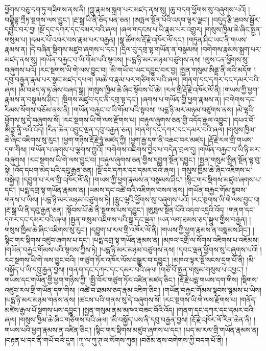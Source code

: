 ཕྱོགས་བཅུ་དག་ཏུ་གཟིགས་ནས་ནི། །ཀླུ་རྣམས་སྐྲག་པར་མཛད་ནས་སུ། །ཆུ་བདག་ཕྱོགས་སུ་བཞུགས་པའོ། །བགྷྣཱིནྟ་ཀྲྀཏ་སྔགས་ལས་བྱུང་། །རྔ་སྒྲ་ཡི་ནི་ཅོད་པན་ཅན། །ཨཏྤལ་སྔོན་པོའི་འདབ་ལྟར་ལྗང་། །བདུད་རྩི་ཐབས་སྦྱོར་དབྱུང་བར་བྱ། །སྔོ་དང་དཀར་དང་དམར་བའི་ཞལ། །ཞལ་གདངས་པ་ཡི་རྣམ་པར་འགྱུར། །གསུས་ཁྱིམ་ཆེ་ཞིང་སྤྱན་གསུམ་པ། །དམར་པོ་འབར་བས་རྣམ་པར་བརྒྱན། །སྣ་ཚོགས་རྡོ་རྗེ་འཁོར་ལོ་དང་། །གཏུན་ཤིང་ཡང་ནི་གཡས་རྣམས་ན། །དེ་བཞིན་སྡིགས་མཛུབ་ཞགས་པ་དང་། །དྲིལ་བུ་དགྲ་སྟ་གཡོན་ན་བསྣམས། །བགེགས་རྣམས་སྐྲག་པར་མཛད་ནས་སུ། །གཡོན་བརྐྱང་བ་ཡི་གོམ་པའི་སྟབས། །པདྨ་ཉི་མར་མཉམ་བཙུགས་ནས། །ལུས་ངན་ཕྱོགས་སུ་བཞུགས་པའོ། །རང་སྔགས་ཡི་གེ་ལས་བྱུང་བ། །མི་གཡོ་བ་ཡང་དབྱུང་བར་བྱ། །སྤྱན་གསུམ་ཨིནྡྲ་ནི་ལའི་མདོག །དབུ་བརྒྱན་རྣམ་པར་སྣང་མཛད་དཔལ། །མཆེ་བ་རྣམ་པར་གཙིགས་པའི་ཞལ། །གནག་དང་དཀར་དང་དམར་བའི་ཞལ། །མི་བཟད་ཧ་ཧ་ཞེས་བཞད་སྒྲ། །གསུས་ཁྱིམ་ཆེ་ཞིང་སྟོབས་པོ་ཆེ། །རལ་གྲི་རྡོ་རྗེ་འཁོར་ལོ་ནི། །གཡས་ཀྱི་ཕྱག་རྣམས་ན་བསྣམས་ཤིང་། །སྡིགས་མཛུབ་དང་ནི་དགྲ་སྟ་དང་། །ཞགས་པ་གཡོན་གྱི་ཕྱག་རྣམས་ན། །བགེགས་དང་རིམས་སོགས་བཅོམ་ནས་ནི། །གཡོན་བརྐྱང་བ་ཡི་གོམ་པའི་སྟབས། །པདྨ་ཉི་མར་མཉམ་བཙུགས་ནས། །མེ་ལྷའི་ཕྱོགས་སུ་དེ་བཞུགས་སོ། །རང་སྔགས་ཡི་གེ་ལས་རྫོགས་པ། །བརྟུལ་ཞུགས་ཅན་གྱི་འདོད་རྒྱལ་འབྱུང་། །དཔའ་བོ་ཨིནྡྲ་ནཱི་ལའི་འོད། །རིན་ཆེན་འབྱུང་ལྡན་དབུ་བརྒྱན་ཅན། །གནག་དང་དཀར་དང་དམར་བའི་ཞལ། །གསུས་ཁྱིམ་ཆེ་ཞིང་འཇིགས་སུ་རུང་། །ཕྱག་གཉིས་རྡོ་རྗེ་ཧཱུཾ་མཛད་ཀྱི། །ཕྱག་རྒྱ་དག་ནི་འཆང་བར་མཛད། །རྡོ་རྗེ་རལ་གྲི་གཡས་དག་གིས། །གཡོན་པ་ཞགས་པ་ལྕགས་ཀྱུའོ། །བགེགས་འཇིགས་བྱེད་པ་བདེན་བྲལ་དུ། །གཡོན་བརྐྱང་བ་ཡི་ཉི་མར་བཞུགས། །རང་སྔགས་ཡི་གེ་ལས་བྱུང་བ། །བརྟུལ་ཞུགས་ཅན་གྱིས་དབྱུག་སྔོན་དབྱུང་། །སྤྱན་གསུམ་སྤྲིན་སྔོན་ལྟ་བུ་སྟེ། །འོད་དཔག་མེད་པའི་དབུ་རྒྱན་ཅན། །སྔོ་དང་དཀར་དང་དམར་བའི་ཞལ། །
གསུས་ཁྱིམ་ཆེ་ཞིང་འཇིགས་པ་བསྐྱེད། །དབྱུག་པ་རལ་གྲི་འཁོར་ལོ་ནི། །གཡས་ཀྱི་ཕྱག་རྣམས་ན་བསྣམས་ཤིང་། །སྙིང་གར་སྡིགས་མཛུབ་ཞགས་པ་དང་། །པདྨ་དགྲ་སྟ་གཡོན་རྣམས་ན། །ཡམས་དང་འཚེ་བའི་འཇིགས་བསལ་ནས། །གཡོན་བརྐྱང་གོམ་སྟབས་གནས་པ་ཡིས། །པདྨ་ཉི་མར་མཉམ་བཙུགས་ཏེ། །རླུང་ལྷའི་ཕྱོགས་སུ་བཞུགས་པའོ། །རང་སྔགས་ཡི་གེ་ལས་བྱུང་བ། །རྔ་སྒྲ་ཡི་ནི་དབུ་རྒྱན་ཅན། །སྟོབས་པོ་ཆེ་ནི་སྔགས་པས་དབྱུང་། །ཨུཏྤལ་སྔོན་པོའི་འདབ་འདྲའི་འོད། །གནག་དང་དཀར་དང་དམར་བའི་ཞལ། །སྤྱན་གསུམ་འཇིགས་པའི་སྒྲ་དང་ལྡན། །ཡན་ལག་ཐམས་ཅད་སྦྲུལ་གྱིས་བརྒྱན། །གསུས་ཁྱིམ་ཆེ་ཞིང་འཇིགས་སུ་རུང་། །དབྱུག་པ་རལ་གྲི་འཁོར་ལོ་ནི། །གཡས་ཀྱི་ཕྱག་རྣམས་ན་བསྣམས་ཤིང་། །སྙིང་གར་སྡིགས་འཛུབ་ཞགས་པ་དང་། །པདྨ་དགྲ་སྟ་གཡོན་རྣམས་ན། །མཁའ་འགྲོ་ལ་སོགས་འཇིགས་པ་འཇོམས། །གཡོན་བརྐྱང་གོམས་པའི་སྟབས་ཀྱིས་ཏེ། །པདྨ་ཉི་མར་མཉམ་བཙུགས་ནས། །དབང་ལྡན་ཕྱོགས་སུ་བཞུགས་པའོ། །རང་སྔགས་ཡི་གེ་ལས་བྱུང་བའི། །གཙུག་ཏོར་འཁོར་ལོས་བསྒྱུར་བ་དབྱུང་། །མཁའ་ལྟར་སྔོ་སངས་དྲག་པོ་ནི། །མི་བསྐྱོད་པ་ཡི་དབུ་རྒྱན་བྱས། །གནག་དང་དཀར་དང་དམར་བའི་ཞལ། །གཙོ་བོ་སྤྱན་གསུམ་གསུས་པ་འཕྱང་། །གཡས་དང་གཡོན་གྱི་ཕྱག་གཉིས་ཀྱི། །སྤྱི་བོར་གཙུག་ཏོར་འཛིན་མཛད་ཅིང་། །རྡོ་རྗེ་པདྨ་གཡས་དག་གིས། །སྡིགས་འཛུབ་རལ་གྲི་གཡོན་དག་གིས། །འཚེ་བ་ཐམས་ཅད་རྣམ་འཇིག་ཅིང་། །གཡོན་བརྐྱང་གོམས་སྟབས་སྙམས་པ་ཡིས། །པདྨ་ཉི་མར་མཉམ་གནས་ནས། །ཚངས་པའི་གནས་སུ་དེ་བཞུགས་སོ། །རང་སྔགས་ཡི་གེ་ལས་རྫོགས་པ། །གནོད་མཛེས་རྒྱལ་པོ་སྔགས་པས་དབྱུང་། །སྤྱན་གསུམ་ནམ་མཁའ་བཟང་བོའི་འོད། །གནག་དང་དཀར་དང་དམར་བའི་ཞལ། །གསུས་ཁྱིམ་ཆེ་ཞིང་གཙིགས་པའི་ཞལ། །མི་བསྐྱོད་པས་ནི་དབུ་བརྒྱན་བྱས། །རྡོ་རྗེ་འཁོར་ལོ་རིན་ཆེན་ནི། །གཡས་པའི་ཕྱག་རྣམས་ན་འཛིན་ཅིང་། །སྙིང་གར་སྡིགས་མཛུབ་ཞགས་པ་དང་། །པད་མ་རལ་གྲི་གཡོན་རྣམས་ན། །བརྟན་པ་དང་ནི་གཡོ་བའི་དུག །ཀཱ་ལ་ཀུ་ཊ་ལ་སོགས་ཀུན། །བཅོམ་ནས་བགེགས་ཀྱི་བདག་པོ་ནི། །
